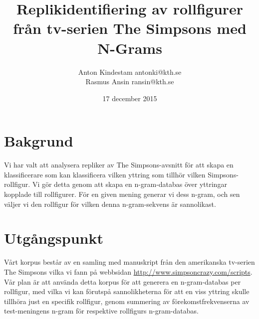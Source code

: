 \documentclass[a4paper]{article}
\author{Anton Kindestam antonki@kth.se\\Rasmus Ansin ransin@kth.se}
\title{Replikidentifiering av rollfigurer från tv-serien The Simpsons med N-Grams}
\date{17 december 2015}
\begin{document}
\maketitle
\tableofcontents


\section{Bakgrund}
Vi har valt att analysera repliker av The Simpsons-avsnitt för att skapa en
klassificerare som kan klassificera vilken yttring som tillhör vilken
Simpsons-rollfigur. Vi gör detta genom att skapa en n-gram-databas över
yttringar kopplade till rollfigurer. För en given mening generar vi dess n-gram,
och sen väljer vi den rollfigur för vilken denna n-gram-sekvens är sannolikast.


\section{Utgångspunkt}

Vårt korpus består av en samling med manuskript från den amerikanska
tv-serien The Simpsons vilka vi fann på webbsidan
\url{http://www.simpsoncrazy.com/scripts}. Vår plan är att använda
detta korpus för att generera en n-gram-databas per rollfigur, med
vilka vi kan förutspå sannolikheterna för att en viss yttring skulle
tillhöra just en specifik rollfigur, genom summering av
förekomstfrekvenserna av test-meningens n-gram för respektive
rollfigurs n-gram-databas.
\end{document}
